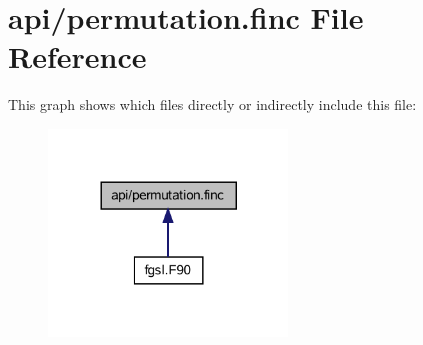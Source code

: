 \hypertarget{permutation_8finc}{}\section{api/permutation.finc File Reference}
\label{permutation_8finc}
This graph shows which files directly or indirectly include this file\+:\nopagebreak
\begin{figure}[H]
\begin{center}
\leavevmode
\includegraphics[width=180pt]{permutation_8finc__dep__incl}
\end{center}
\end{figure}
